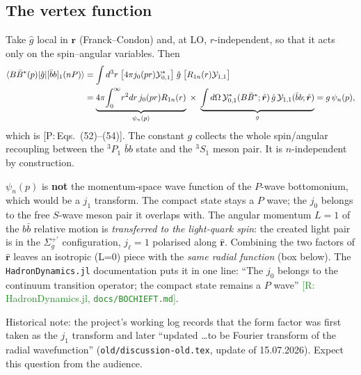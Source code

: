 \documentclass[11pt,a4paper]{article}
\newcommand{\tagP}[1]{\textcolor{blue!65!black}{\textsf{\small[P:\,#1]}}}
\newcommand{\tagR}[1]{\textcolor{ForestGreen}{\textsf{\small[R:\,#1]}}}
\newcommand{\tagD}{\textcolor{orange!85!black}{\textsf{\small[D]}}}
\newcommand{\BBst}{B\bar B^*}
\newcommand{\bbnP}{[\bar bb]_1(nP)}
\newcommand{\calY}{{\cal Y}}
\begin{document}
\subsection{The vertex function}

\begin{derbox}[Derivation of the vertex \tagD]
Take $\hat g$ local in $\bm r$ (Franck--Condon) and, at LO, $r$-independent, so that it acts only on the spin--angular variables. Then
\begin{align}
\braket{\BBst(p)|\hat g|\bbnP}
&=\int d^3r\;\big[4\pi j_0(pr)\calY_{0,1}^*\big]\;\hat g\;\big[R_{1n}(r)\calY_{1,1}\big]\nonumber\\
&=\underbrace{4\pi\!\int_0^\infty\! r^2dr\,j_0(pr)R_{1n}(r)}_{\psi_n(p)}\;\times\;\underbrace{\int d\Omega\,\calY^{*}_{0,1}(\BBst;\hat{\bm r})\,\hat g\,\calY_{1,1}(\bar bb;\hat{\bm r})}_{g}
=g\,\psi_n(p),
\label{eq:FC}
\end{align}
which is \tagP{Eqs.~(52)--(54)}. The constant $g$ collects the whole spin/angular recoupling between the $^3P_1$ $\bar bb$ state and the $^3S_1$ meson pair. It is $n$-independent by construction.
\end{derbox}

\begin{keybox}
$\psi_n(p)$ is \textbf{not} the momentum-space wave function of the $P$-wave bottomonium, which would be a $j_1$ transform. The compact state stays a $P$ wave; the $j_0$ belongs to the free $S$-wave meson pair it overlaps with. The angular momentum $L=1$ of the $b\bar b$ relative motion is \emph{transferred to the light-quark spin}: the created light pair is in the $\Sigma_g^{+\prime}$ configuration, $j_\ell=1$ polarised along $\hat{\bm r}$. Combining the two factors of $\hat{\bm r}$ leaves an isotropic (L=0) piece with the \emph{same radial function} (box below). The \texttt{HadronDynamics.jl} documentation puts it in one line: ``The $j_0$ belongs to the continuum transition operator; the compact state remains a $P$ wave'' \tagR{HadronDynamics.jl, \texttt{docs/BOCHIEFT.md}}.

Historical note: the project's working log records that the form factor was first taken as the $j_1$ transform and later ``updated \dots to be Fourier transform of the radial wavefunction'' (\texttt{old/discussion-old.tex}, update of 15.07.2026). Expect this question from the audience.
\end{keybox}
\end{document}
